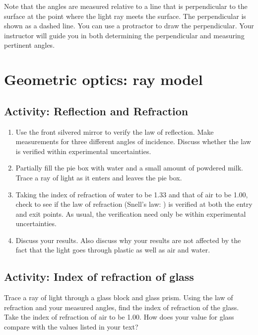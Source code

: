 \begin{multicols}{2}
Note that the angles are measured relative to a line that is perpendicular to the surface at the point where the light ray meets the surface.  The perpendicular is shown as a dashed line.  You can use a protractor to draw the perpendicular.  Your instructor will guide you in both determining the perpendicular and measuring pertinent angles.

\section{Geometric optics: ray model}

\subsection{Activity: Reflection and Refraction}
\begin{enumerate}
	\item Use the front silvered mirror to verify the law of reflection.  Make measurements for three different angles of incidence.  Discuss whether the law is verified within experimental uncertainties.

	\item Partially fill the pie box with water and a small amount of powdered milk. Trace a ray of light as it enters and leaves the pie box.  
	\item Taking the index of refraction of water to be 1.33 and that of air to be 1.00, check to see if the law of refraction (Snell's law: ) is verified at both the entry and exit points.  As usual, the verification need only be within experimental uncertainties.
	\item Discuss your results. Also discuss why your results are not affected by the fact that the light goes through plastic as well as air and water.
\end{enumerate}
	
\subsection{Activity: Index of refraction of glass}
Trace a ray of light through a glass block and glass prism.  Using the law of refraction and your measured angles, find the index of refraction of the glass.  Take the index of refraction of air to be 1.00.  How does your value for glass compare with the values listed in your text?


\end{multicols}
